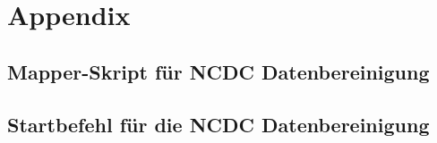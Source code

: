 \chapter{Appendix}

\section{Mapper-Skript für NCDC Datenbereinigung}\label{appendix lst:ncdc concatenate script}


\section{Startbefehl für die NCDC Datenbereinigung}\label{appendix lst:ncdc concatenate start script}
